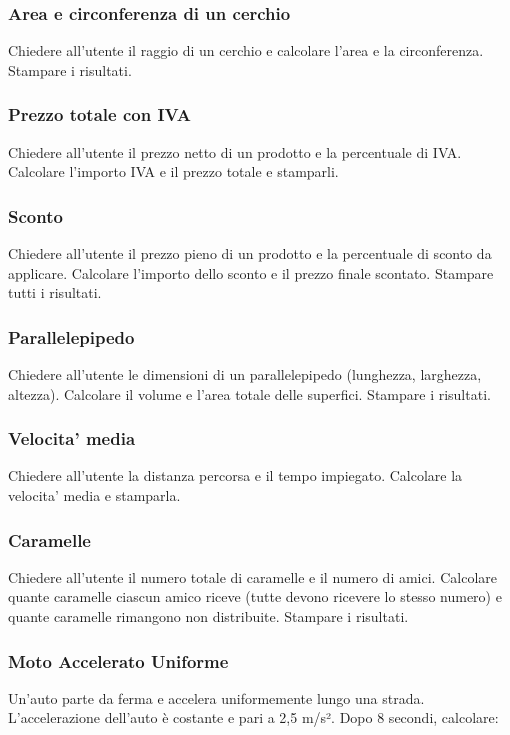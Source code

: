 \documentclass[a4paper,12pt]{article}
\begin{document}
	\subsubsection{Area e circonferenza di un cerchio}
	Chiedere all'utente il raggio di un cerchio e calcolare l'area e la circonferenza. Stampare i risultati.
	
	\subsubsection{Prezzo totale con IVA}
	Chiedere all'utente il prezzo netto di un prodotto e la percentuale di IVA. Calcolare l'importo IVA e il prezzo totale e stamparli.
	
	\subsubsection{Sconto}
	Chiedere all'utente il prezzo pieno di un prodotto e la percentuale di sconto da applicare. Calcolare l'importo dello sconto e il prezzo finale scontato. Stampare tutti i risultati.
	

	
	\subsubsection{Parallelepipedo}
	Chiedere all'utente le dimensioni di un parallelepipedo (lunghezza, larghezza, altezza). Calcolare il volume e l'area totale delle superfici. Stampare i risultati.
	
	\subsubsection{Velocita' media}
	Chiedere all'utente la distanza percorsa e il tempo impiegato. Calcolare la velocita' media e stamparla.
	
	\subsubsection{Caramelle}
	Chiedere all'utente il numero totale di caramelle e il numero di amici. Calcolare quante caramelle ciascun amico riceve (tutte devono ricevere lo stesso numero) e quante caramelle rimangono non distribuite. Stampare i risultati.
	
	
	\subsubsection{Moto Accelerato Uniforme}
	Un’auto parte da ferma e accelera uniformemente lungo una strada. L’accelerazione dell’auto è costante e pari a 2,5 m/s². Dopo 8 secondi, calcolare:
	
\end{document}
